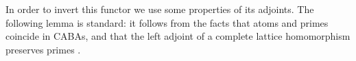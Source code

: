 In order to invert this functor we use some properties of its adjoints. The
following lemma is standard: it follows from the facts that atoms and primes
coincide in CABAs, and that the left adjoint of a complete lattice
homomorphism preserves primes \cite[Lemma 1.23 and Exercise 1.3.10.e]{gehrke_2024}.




